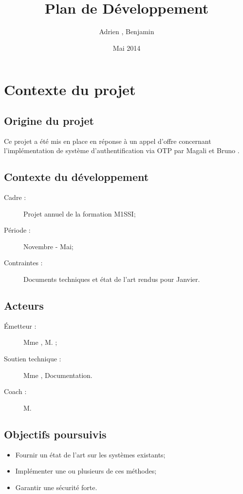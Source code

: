 \documentclass{../../res/univ-projet}
\title{Plan de Développement}
\author{Adrien \bsc{Smondack}, Benjamin \bsc{Zigh}}
\date{Mai 2014}
\begin{document}
\maketitle

\section{Contexte du projet}
\subsection{Origine du projet}
	Ce projet a été mis en place en réponse à un appel d'offre concernant l'implémentation de système d'authentification via OTP par Magali  et Bruno .
	
\subsection{Contexte du développement}
	\begin{description} 
		\item [Cadre :] Projet annuel de la formation M1SSI;
		\item [Période :] Novembre - Mai;
		\item [Contraintes :] Documents techniques et état de l'art rendus pour Janvier.
	\end{description}

\subsection{Acteurs}
	\begin{description}
		\item [Émetteur :] Mme , M. ;
		\item [Soutien technique :] Mme , Documentation.
		\item [Coach :] M. 
	\end{description}

\subsection{Objectifs poursuivis}
	\begin{itemize}
		\item Fournir un état de l'art sur les systèmes existants;
		\item Implémenter une ou plusieurs de ces méthodes;
		\item Garantir une sécurité forte.
	\end{itemize}
\end{document}

